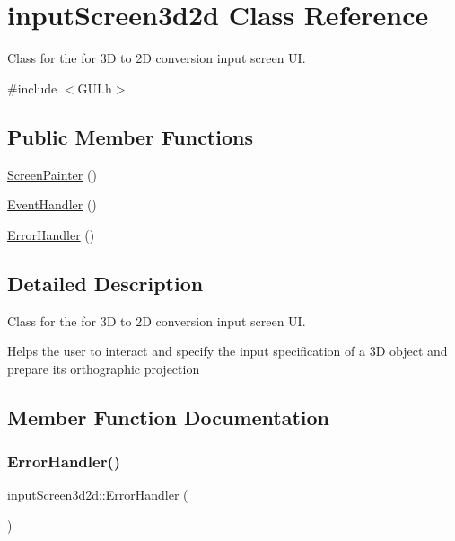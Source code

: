 \hypertarget{classinput_screen3d2d}{}\section{input\+Screen3d2d Class Reference}
\label{classinput_screen3d2d}


Class for the for 3D to 2D conversion input screen UI.  




{\ttfamily \#include $<$G\+U\+I.\+h$>$}

\subsection*{Public Member Functions}
\begin{DoxyCompactItemize}
\item 
\mbox{\hyperlink{classinput_screen3d2d_af0c3df669aff35608d38fd4ef30e31bb}{Screen\+Painter}} ()
\item 
\mbox{\hyperlink{classinput_screen3d2d_a0f023449b6fe3d8b7b981767976129de}{Event\+Handler}} ()
\item 
\mbox{\hyperlink{classinput_screen3d2d_a8ea2645bebe00478695dcbc895c928da}{Error\+Handler}} ()
\end{DoxyCompactItemize}


\subsection{Detailed Description}
Class for the for 3D to 2D conversion input screen UI. 

Helps the user to interact and specify the input specification of a 3D object and prepare its orthographic projection 

\subsection{Member Function Documentation}
\mbox{\label{classinput_screen3d2d_a8ea2645bebe00478695dcbc895c928da}} 
\subsubsection{\texorpdfstring{Error\+Handler()}{ErrorHandler()}}
{\footnotesize\ttfamily input\+Screen3d2d\+::\+Error\+Handler (\begin{DoxyParamCaption}{ }\end{DoxyParamCaption})}

